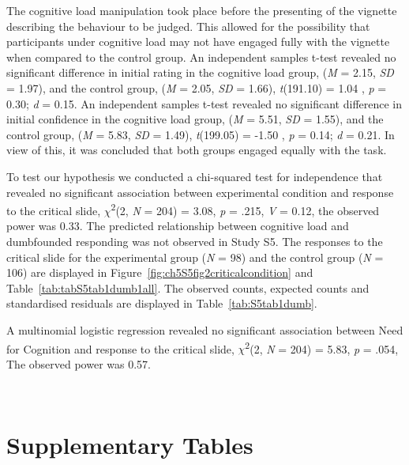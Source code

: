 \documentclass[
  american,
  man,floatsintext]{apa7}
\begin{document}
The cognitive load manipulation took place before the presenting of the vignette describing the behaviour to be judged. This allowed for the possibility that participants under cognitive load may not have engaged fully with the vignette when compared to the control group. An independent samples t-test revealed no significant difference in initial rating in the cognitive load group, (\emph{M} = 2.15, \emph{SD} = 1.97), and the control group, (\emph{M} = 2.05, \emph{SD} = 1.66), \emph{t}(191.10) = 1.04 , \emph{p} = 0.30; \emph{d} = 0.15. An independent samples t-test revealed no significant difference in initial confidence in the cognitive load group, (\emph{M} = 5.51, \emph{SD} = 1.55), and the control group, (\emph{M} = 5.83, \emph{SD} = 1.49), \emph{t}(199.05) = -1.50 , \emph{p} = 0.14; \emph{d} = 0.21. In view of this, it was concluded that both groups engaged equally with the task.

To test our hypothesis we conducted a chi-squared test for independence that revealed no significant association between experimental condition and response to the critical slide, \(\chi\)\textsuperscript{2}(2, \emph{N} = 204) = 3.08, \emph{p} = .215, \emph{V} = 0.12, the observed power was 0.33. The predicted relationship between cognitive load and dumbfounded responding was not observed in Study S5. The responses to the critical slide for the experimental group (\emph{N} = 98) and the control group (\emph{N} = 106) are displayed in Figure~\ref{fig:ch5S5fig2criticalcondition} and Table~\ref{tab:tabS5tab1dumb1all}. The observed counts, expected counts and standardised residuals are displayed in Table~\ref{tab:S5tab1dumb}.

A multinomial logistic regression revealed no significant association between Need for Cognition and response to the critical slide, \(\chi\)\textsuperscript{2}(2, \emph{N} = 204) = 5.83, \emph{p} = .054, The observed
power was 0.57.

\newpage

~

\hypertarget{supplementary-tables}{%
\section{Supplementary Tables}\label{supplementary-tables}}

\newpage

~
\end{document}
